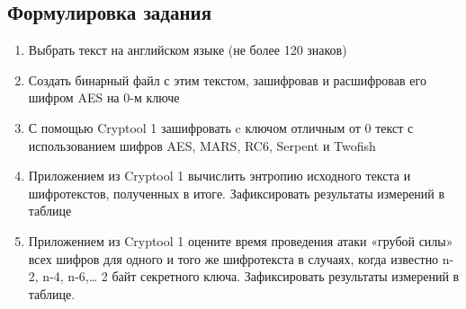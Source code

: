 \documentclass[a4paper, 14pt]{extarticle}
\begin{document}
\subsection{Формулировка задания}
\begin{enumerate}
    \item Выбрать текст на английском языке (не более 120 знаков)
    \item  Создать бинарный файл с этим текстом, зашифровав и расшифровав его шифром AES на 0-м ключе
    \item  С помощью Cryptool 1 зашифровать c ключом отличным от 0 текст с использованием шифров AES, MARS, RC6, Serpent и Twofish
    \item  Приложением из Cryptool 1 вычислить энтропию исходного текста и шифротекстов, полученных в итоге. Зафиксировать результаты измерений в таблице
    \item  Приложением из Cryptool 1 оцените время проведения атаки «грубой силы» всех шифров для одного и того же шифротекста в случаях, когда известно n-2, n-4, n-6,\ldots{} 2 байт секретного ключа. Зафиксировать результаты измерений в таблице.
\end{enumerate}
\end{document}
